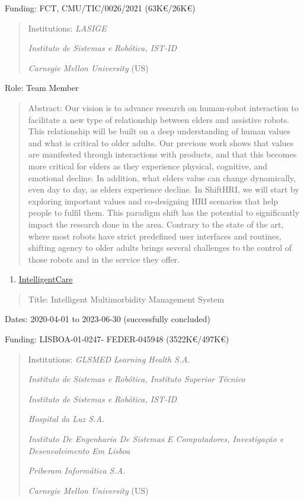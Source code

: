\documentclass[
]{article}
\begin{document}
Funding: FCT, CMU/TIC/0026/2021 (63K€/26K€)

\begin{quote}
Institutions: \emph{LASIGE}

\emph{Instituto de Sistemas e Robótica, IST-ID}

\emph{Carnegie Mellon University} (US)
\end{quote}

Role: Team Member

\begin{quote}
Abstract: Our vision is to advance research on human-robot interaction
to facilitate a new type of relationship between elders and assistive
robots. This relationship will be built on a deep understanding of human
values and what is critical to older adults. Our previous work shows
that values are manifested through interactions with products, and that
this becomes more critical for elders as they experience physical,
cognitive, and emotional decline. In addition, what elders value can
change dynamically, even day to day, as elders experience decline. In
ShiftHRI, we will start by exploring important values and co-designing
HRI scenarios that help people to fulfil them. This paradigm shift has
the potential to significantly impact the research done in the area.
Contrary to the state of the art, where most robots have strict
predefined user interfaces and routines, shifting agency to older adults
brings several challenges to the control of those robots and in the
service they offer.
\end{quote}

\begin{enumerate}
\def\labelenumi{\arabic{enumi}.}
\setcounter{enumi}{2}
\item
  \ul{IntelligentCare}
\end{enumerate}

\begin{quote}
Title: Intelligent Multimorbidity Management System
\end{quote}

Dates: 2020-04-01 to 2023-06-30 (successfully concluded)

Funding: LISBOA-01-0247- FEDER-045948 (3522K€/497K€)

\begin{quote}
Institutions: \emph{GLSMED Learning Health S.A.}

\emph{Instituto de Sistemas e Robótica, Instituto Superior Técnico}

\emph{Instituto de Sistemas e Robótica, IST-ID}

\emph{Hospital da Luz S.A.}

\emph{Instituto De Engenharia De Sistemas E Computadores, Investigação e
Desenvolvimento Em Lisboa}

\emph{Priberam Informática S.A.}

\emph{Carnegie Mellon University} (US)
\end{quote}
\end{document}
